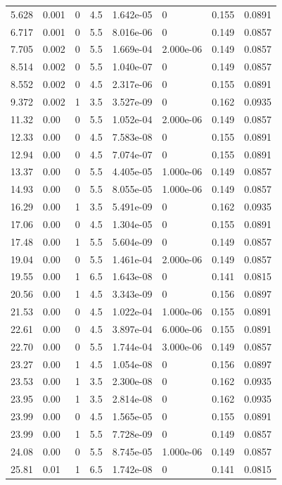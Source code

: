 \documentclass[preview]{standalone}
\begin{document}
{{\begin{tabular}{L{1.2cm}C{1.2cm} C{0.3cm}C{0.5cm} C{1.4cm}C{1.4cm} C{1.4cm}C{1.4cm}}
  5.628  &  0.001  & 0     & 4.5 &  1.642e-05  & 0  & 0.155 &  0.0891   \\ 
  6.717  &  0.001  & 0     & 5.5 &  8.016e-06  & 0  & 0.149 &  0.0857   \\ 
  7.705  &  0.002  & 0     & 5.5 &  1.669e-04  & 2.000e-06  & 0.149 &  0.0857   \\ 
  8.514  &  0.002  & 0     & 5.5 &  1.040e-07  & 0  & 0.149 &  0.0857   \\ 
  8.552  &  0.002  & 0     & 4.5 &  2.317e-06  & 0  & 0.155 &  0.0891   \\ 
  9.372  &  0.002  & 1     & 3.5 &  3.527e-09  & 0  & 0.162 &  0.0935   \\ 
  11.32  &  0.00  & 0     & 5.5 &  1.052e-04  & 2.000e-06  & 0.149 &  0.0857   \\ 
  12.33  &  0.00  & 0     & 4.5 &  7.583e-08  & 0  & 0.155 &  0.0891   \\ 
  12.94  &  0.00  & 0     & 4.5 &  7.074e-07  & 0  & 0.155 &  0.0891   \\ 
  13.37  &  0.00  & 0     & 5.5 &  4.405e-05  & 1.000e-06  & 0.149 &  0.0857   \\ 
  14.93  &  0.00  & 0     & 5.5 &  8.055e-05  & 1.000e-06  & 0.149 &  0.0857   \\ 
  16.29  &  0.00  & 1     & 3.5 &  5.491e-09  & 0  & 0.162 &  0.0935   \\ 
  17.06  &  0.00  & 0     & 4.5 &  1.304e-05  & 0  & 0.155 &  0.0891   \\ 
  17.48  &  0.00  & 1     & 5.5 &  5.604e-09  & 0  & 0.149 &  0.0857   \\ 
  19.04  &  0.00  & 0     & 5.5 &  1.461e-04  & 2.000e-06  & 0.149 &  0.0857   \\ 
  19.55  &  0.00  & 1     & 6.5 &  1.643e-08  & 0  & 0.141 &  0.0815   \\ 
  20.56  &  0.00  & 1     & 4.5 &  3.343e-09  & 0  & 0.156 &  0.0897   \\ 
  21.53  &  0.00  & 0     & 4.5 &  1.022e-04  & 1.000e-06  & 0.155 &  0.0891   \\ 
  22.61  &  0.00  & 0     & 4.5 &  3.897e-04  & 6.000e-06  & 0.155 &  0.0891   \\ 
  22.70  &  0.00  & 0     & 5.5 &  1.744e-04  & 3.000e-06  & 0.149 &  0.0857   \\ 
  23.27  &  0.00  & 1     & 4.5 &  1.054e-08  & 0  & 0.156 &  0.0897   \\ 
  23.53  &  0.00  & 1     & 3.5 &  2.300e-08  & 0  & 0.162 &  0.0935   \\ 
  23.95  &  0.00  & 1     & 3.5 &  2.814e-08  & 0  & 0.162 &  0.0935   \\ 
  23.99  &  0.00  & 0     & 4.5 &  1.565e-05  & 0  & 0.155 &  0.0891   \\ 
  23.99  &  0.00  & 1     & 5.5 &  7.728e-09  & 0  & 0.149 &  0.0857   \\ 
  24.08  &  0.00  & 0     & 5.5 &  8.745e-05  & 1.000e-06  & 0.149 &  0.0857   \\ 
  25.81  &  0.01  & 1     & 6.5 &  1.742e-08  & 0  & 0.141 &  0.0815   \\ 
\hline 
\end{tabular} 

}}
\end{document}
